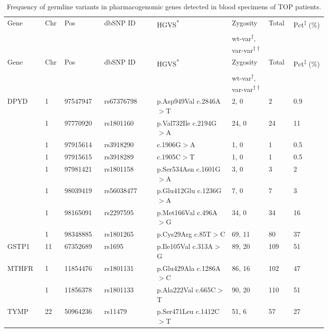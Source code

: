 \newpage
\begin{longtable}{p{0.09\linewidth}|p{0.02\linewidth}p{0.1\linewidth}p{0.14\linewidth}p{0.2\linewidth}p{0.08\linewidth}p{0.04\linewidth}p{0.09\linewidth}}
\caption{Frequency of germline variants in pharmacogenomic genes detected in blood specimens of TOP patients.}
\label{tbl:freq_germline_pgx_genes}
		\\
		\hline
		Gene & Chr & Pos & dbSNP ID & HGVS\textsuperscript{*} & Zygosity & Total & Pct\textsuperscript{$\ddagger$} (\%)
		\\
		&
		\multicolumn{4}{l}{}
		&
		\multicolumn{1}{l}{wt-var\textsuperscript{$\dagger$}, var-var\textsuperscript{$\dagger\dagger$}}
		&
		\multicolumn{2}{l}{}
		\\
		\hline
    \endfirsthead
    \hline
		Gene & Chr & Pos & dbSNP ID & HGVS\textsuperscript{*} & Zygosity & Total & Pct\textsuperscript{$\ddagger$} (\%)
		\\
		&
		\multicolumn{4}{l}{}
		&
		\multicolumn{1}{l}{wt-var\textsuperscript{$\dagger$}, var-var\textsuperscript{$\dagger\dagger$}}
		&
		\multicolumn{2}{l}{}
		\\
		\hline
    \endhead
		DPYD & 1 & 97547947 & rs67376798 & p.Asp949Val c.2846A$>$T & 2, 0 & 2 & 0.9
		\\
		& 1 & 97770920 & rs1801160 & p.Val732Ile c.2194G$>$A & 24, 0 & 24 & 11
		\\
		& 1 & 97915614 & rs3918290 & c.1906G$>$A & 1, 0 & 1 & 0.5
		\\
		& 1 & 97915615 & rs3918289 & c.1905C$>$T & 1, 0 & 1 & 0.5
		\\
		& 1 & 97981421 & rs1801158 & p.Ser534Asn c.1601G$>$A & 3, 0 & 3 & 2
		\\
		& 1 & 98039419 & rs56038477 & p.Glu412Glu c.1236G$>$A & 7, 0 & 7 & 3
		\\
		& 1 & 98165091 & rs2297595 & p.Met166Val c.496A$>$G & 34, 0 & 34 & 16
		\\
		& 1 & 98348885 & rs1801265 & p.Cys29Arg c.85T$>$C & 69, 11 & 80 & 37
		\\
		\hline
		GSTP1 & 11 & 67352689 & rs1695 & p.Ile105Val c.313A$>$G & 89, 20 & 109 & 51
		\\
		\hline
		MTHFR & 1 & 11854476 & rs1801131 & p.Glu429Ala c.1286A$>$C & 86, 16 & 102 & 47
		\\
		& 1 & 11856378 & rs1801133 & p.Ala222Val c.665C$>$T & 90, 20 & 110 & 51
		\\
		\hline
		TYMP & 22 & 50964236 & rs11479 & p.Ser471Leu c.1412C$>$T & 51, 6 & 57 & 27
		\\

\end{longtable}
